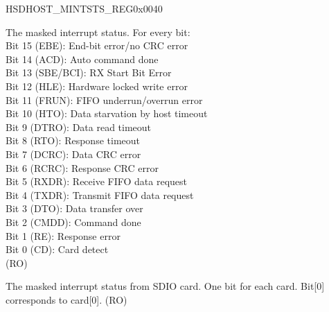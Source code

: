 \begin{register}{H}{SDHOST\_MINTSTS\_REG}{0x0040}\label{regdesc:SDHOSTMINTSTSREG}
%
%
%
\regnewline%
\begin{regdesc}\begin{reglist}
\label{fielddesc:SDHOSTINTSTATUSMSK}\item [SDHOST\_INT\_STATUS\_MSK] The masked interrupt status. For every bit:\\
Bit 15 (EBE): End-bit error/no CRC error\\
Bit 14 (ACD): Auto command done\\
Bit 13 (SBE/BCI): RX Start Bit Error\\
Bit 12 (HLE): Hardware locked write error\\
Bit 11 (FRUN): FIFO underrun/overrun error\\
Bit 10 (HTO): Data starvation by host timeout\\
Bit 9 (DTRO): Data read timeout\\
Bit 8 (RTO): Response timeout\\
Bit 7 (DCRC): Data CRC error\\
Bit 6 (RCRC): Response CRC error\\
Bit 5 (RXDR): Receive FIFO data request\\
Bit 4 (TXDR): Transmit FIFO data request\\
Bit 3 (DTO): Data transfer over\\
Bit 2 (CMDD): Command done\\
Bit 1 (RE): Response error\\
Bit 0 (CD): Card detect\\ (RO)
\label{fielddesc:SDHOSTSDIOINTERRUPTMSK}\item [SDHOST\_SDIO\_INTERRUPT\_MSK] The masked interrupt status from SDIO card. One bit for each card. Bit[0] corresponds to card[0]. (RO)
\end{reglist}\end{regdesc}
\end{register}


